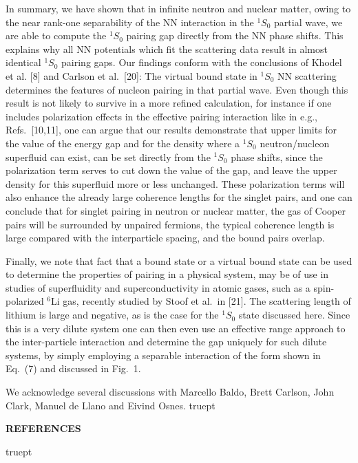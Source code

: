 In summary, we have shown that in infinite neutron and nuclear matter, 
owing to the near rank-one separability of the NN interaction in 
the $^1S_0$ partial wave,  
we are able to compute the $^1S_0$ pairing gap directly from the NN 
phase shifts. This explains why all NN potentials which fit 
the scattering data result in almost identical $^1S_0$ pairing gaps.  
Our findings conform with the conclusions of Khodel et al. [8] 
and Carlson et al.\ [20]: 
The virtual bound state in $^1S_0$ NN scattering determines  
the features of nucleon pairing in that partial wave.    
Even though  this result    
is not likely to survive in a more refined calculation, for instance 
if one includes polarization effects in the 
effective pairing interaction like in e.g., Refs.\ [10,11], 
one can argue that our results demonstrate that upper limits for 
the value of the energy gap and for the density where a 
$^1S_0$ neutron/nucleon superfluid can exist, can be set 
directly from the $^1S_0$ phase shifts, since the polarization term 
serves to cut down the value of the gap, and leave the upper density 
for this superfluid more or less unchanged.    
These polarization terms will also enhance the already large 
coherence lengths for the singlet pairs, and one can conclude that for
singlet pairing in neutron or nuclear matter,  
the gas of Cooper pairs will be surrounded by unpaired fermions, 
the typical coherence length is large compared with the interparticle
spacing, and the bound pairs overlap. 


Finally, we note that
fact that a bound state or a virtual bound state 
can be used to determine the properties of pairing in a physical system,
may be of use in studies of superfluidity and superconductivity in atomic
gases, such as
a spin-polarized $^6$Li gas, recently studied by 
Stoof et al.\  in [21].  
The scattering length of lithium
is large and negative, as is the case for the $^1S_0$ state discussed here.
Since this is a very dilute system
one can then even use an effective range
approach to the inter-particle interaction and determine
the gap uniquely for such dilute systems, by simply employing a separable
interaction of the form shown in Eq.\ (7) and discussed
in Fig.\ 1. 

We acknowledge several discussions with Marcello Baldo, Brett Carlson, 
John Clark, Manuel de Llano and Eivind Osnes. 
 truept

\centerline{\bf REFERENCES}

 truept


